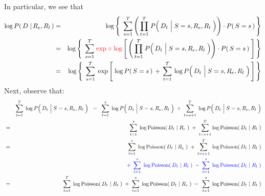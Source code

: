 In particular, we see that
\begin{eqnarray*}
\log P\!\left(\,D \;\vert\, R_{e},R_{l}\,\right)
&=&
	\log\left\{\;\,
		\overset{T}{\underset{s=1}{\sum}}
		\left(\,
			\overset{T}{\underset{t=1}{\prod}}\;
			P\!\left(\,D_{t} \,\left\vert\; S\overset{{\color{white}1}}{=}s,R_{e},R_{l}\right.\,\right)
			\right)
		\cdot
		P\!\left(\,S=s\,\right)
		\,\right\}
\\
& = &
	\log\left\{\;\,
	\overset{T}{\underset{s=1}{\sum}}\;
	{\color{red}\exp\,\circ\,\log}\left[\,
		\left(\,
			\overset{T}{\underset{t=1}{\prod}}\;
			P\!\left(\,D_{t} \,\left\vert\; S\overset{{\color{white}1}}{=}s,R_{e},R_{l}\right.\,\right)
			\right)
		\cdot
		P\!\left(\,S=s\,\right)
		\;\right]
	\,\right\}
\\
& = &
	\log\left\{\;\,
	\overset{T}{\underset{s=1}{\sum}}\;
	\exp\left[\;\log P\!\left(\,S=s\,\right)
			\, + \,
			\overset{T}{\underset{t=1}{\sum}}\,
				\log P\!\left(\,D_{t} \,\left\vert\; S\overset{{\color{white}1}}{=}s,R_{e},R_{l}\right.\,\right)
		\,\right]
	\,\right\}
\end{eqnarray*}
Next, observe that:
\begin{eqnarray*}
&&
	\overset{T}{\underset{t=1}{\sum}}\;
	\log P\!\left(\,D_{t} \,\left\vert\; S\overset{{\color{white}1}}{=}s,R_{e},R_{l}\right.\,\right)
\;\; = \;\;
	\overset{s}{\underset{t=1}{\sum}}\;
	\log P\!\left(\,D_{t} \,\left\vert\; S\overset{{\color{white}1}}{=}s,R_{e},R_{l}\right.\,\right)
	\; + \;
	\overset{T}{\underset{t=s+1}{\sum}}\;
	\log P\!\left(\,D_{t} \,\left\vert\; S\overset{{\color{white}1}}{=}s,R_{e},R_{l}\right.\,\right)
\\
&=&
	\overset{s}{\underset{t=1}{\sum}}\;
	\log\textnormal{Poisson}\!\left(\,D_{t} \,\left\vert\; R_{e}\right.\,\right)
	\; + \;
	\overset{T}{\underset{t=s+1}{\sum}}
	\log\textnormal{Poisson}\!\left(\,D_{t} \,\left\vert\; R_{l}\right.\,\right)
\\
&=&
	{\color{white}+}\;\,
	\overset{s}{\underset{t=1}{\sum}}\;
	\log\textnormal{Poisson}\!\left(\,D_{t} \,\left\vert\; R_{e}\right.\,\right)
	\; + \;
	\overset{T}{\underset{t=s+1}{\sum}}\;
	\log\textnormal{Poisson}\!\left(\,D_{t} \,\left\vert\; R_{l}\right.\,\right)
\\
&&
	{\color{blue}
	+\;\,
	\overset{s}{\underset{t=1}{\sum}}\;
	\log\textnormal{Poisson}\!\left(\,D_{t} \,\left\vert\; R_{l}\right.\,\right)
	\; - \;
	\overset{s}{\underset{t=1}{\sum}}\;
	\log\textnormal{Poisson}\!\left(\,D_{t} \,\left\vert\; R_{l}\right.\,\right)
	}
\\
&=&
	\overset{T}{\underset{t=1}{\sum}}\;
	\log\textnormal{Poisson}\!\left(\,D_{t} \,\left\vert\; R_{l}\right.\,\right)
	\;+\;
	\overset{s}{\underset{t=1}{\sum}}\;
	\log\textnormal{Poisson}\!\left(\,D_{t} \,\left\vert\; R_{e}\right.\,\right)
		\;-\;\,
		\overset{s}{\underset{t=1}{\sum}}\;
		\log\textnormal{Poisson}\!\left(\,D_{t} \,\left\vert\; R_{l}\right.\,\right)
\end{eqnarray*}
